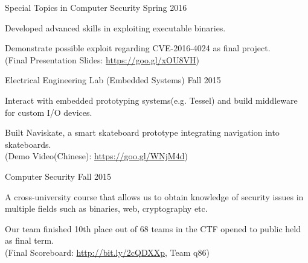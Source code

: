  \begin{cventries}
    \cventry
      {}
      {Special Topics in Computer Security}
      {Spring 2016}
      {}
      {
        \begin{cvitems}
          \item {Developed advanced skills in exploiting executable binaries.}
          \item {Demonstrate possible exploit regarding CVE-2016-4024 as final project.\\(Final Presentation Slides: \href{http://goo.gl/xOU8VH}{https://goo.gl/xOU8VH})}
        \end{cvitems}
      }
    \cventry
      {}
      {Electrical Engineering Lab (Embedded Systems)}
      {Fall 2015}
      {}
      {
        \begin{cvitems}
          \item {Interact with embedded prototyping systems(e.g. Tessel) and build middleware for custom I/O devices.}
          \item {Built Naviskate, a smart skateboard prototype integrating navigation into skateboards.\\(Demo Video(Chinese): \href{https://goo.gl/WNjM4d}{https://goo.gl/WNjM4d})}
        \end{cvitems}
      }
    \cventry
      {}
      {Computer Security}
      {Fall 2015}
      {}
      {
        \begin{cvitems}
          \item {A cross-university course that allows us to obtain knowledge of security issues in multiple fields such as binaries, web, cryptography etc.}
          \item {Our team finished 10th place out of 68 teams in the CTF opened to public held as final term.\\(Final Scoreboard: \href{http://bit.ly/2cQDXXp}{http://bit.ly/2cQDXXp}, Team q86)}
        \end{cvitems}
      }
  \end{cventries}